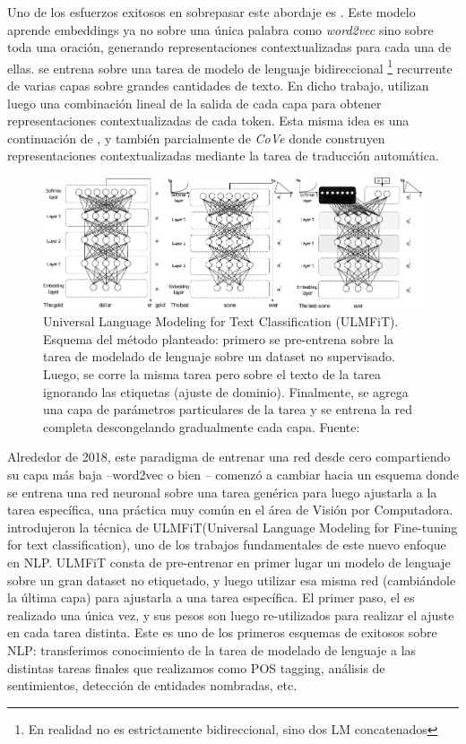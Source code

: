 Uno de los esfuerzos exitosos en sobrepasar este abordaje es \elmo{} \cite{peters2018}. Este modelo aprende embeddings ya no sobre una única palabra como \emph{word2vec} sino sobre toda una oración, generando representaciones contextualizadas para cada una de ellas. \elmo{} se entrena sobre una tarea de modelo de lenguaje bidireccional \footnote{En realidad no es estrictamente bidireccional, sino dos LM concatenados} recurrente de varias capas sobre grandes cantidades de texto. En dicho trabajo, utilizan luego una combinación lineal de la salida de cada capa para obtener representaciones contextualizadas de cada token. Esta misma idea es una continuación de \citet{peters2017semi}, y también parcialmente de \emph{CoVe} \cite{mccann2017learned} donde construyen representaciones contextualizadas mediante la tarea de traducción automática.

\begin{figure}[t]
    \centering
    \includegraphics[width=\textwidth]{img/02/ulmfit.pdf}
    \caption{Universal Language Modeling for Text Classification (ULMFiT). Esquema del método planteado: primero se pre-entrena sobre la tarea de modelado de lenguaje sobre un dataset no supervisado. Luego, se corre la misma tarea pero sobre el texto de la tarea ignorando las etiquetas (ajuste de dominio). Finalmente, se agrega una capa de parámetros particulares de la tarea y se entrena la red completa descongelando gradualmente cada capa. Fuente: \citet{howard-ruder-2018-universal}}
    \label{fig:ulmfit}
\end{figure}

Alrededor de 2018, este paradigma de entrenar una red desde cero compartiendo su capa más baja --word2vec o bien \elmo{}-- comenzó a cambiar hacia un esquema donde se entrena una red neuronal sobre una tarea genérica para luego ajustarla a la tarea específica, una práctica muy común en el área de Visión por Computadora. \citet{howard-ruder-2018-universal} introdujeron la técnica de ULMFiT(Universal Language Modeling for Fine-tuning for text classification), uno de los trabajos fundamentales de este nuevo enfoque en NLP. ULMFiT consta de pre-entrenar en primer lugar un modelo de lenguaje sobre un gran dataset no etiquetado, y luego utilizar esa misma red (cambiándole la última capa) para ajustarla a una tarea específica. El primer paso, el  es realizado una única vez, y sus pesos son luego re-utilizados para realizar el ajuste en cada tarea distinta. Este es uno de los primeros esquemas de  exitosos sobre NLP: transferimos conocimiento de la tarea de modelado de lenguaje a las distintas tareas finales que realizamos como POS tagging, análisis de sentimientos, detección de entidades nombradas, etc.

